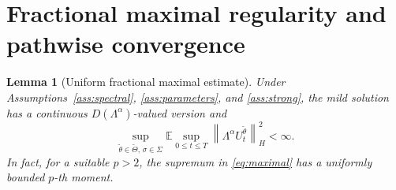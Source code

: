 \documentclass[11pt]{article}
\newtheorem{lemma}[assumption]{Lemma}
\theoremstyle{remark}
\newcommand{\E}{\mathbb E}
\newcommand{\1}{\mathbf 1}
\newcommand{\hnorm}[1]{\left\lVert #1\right\rVert_H}
\newcommand{\ThetaI}{\widetilde\Theta}
\newcommand{\Lambdaop}{\Lambda}
\begin{document}
\section{Fractional maximal regularity and pathwise convergence}

\begin{lemma}[Uniform fractional maximal estimate]\label{lem:maximal}
Under Assumptions~\ref{ass:spectral}, \ref{ass:parameters}, and \ref{ass:strong}, the mild solution has a continuous \(D(\Lambdaop^\alpha)\)-valued version and
\begin{equation}\label{eq:maximal}
 \sup_{\widetilde\theta\in\ThetaI,\,\sigma\in\Sigma}
 \E\sup_{0\le t\le T}
 \hnorm{\Lambdaop^\alpha U_t^{\widetilde\theta}}^2
 <\infty.
\end{equation}
In fact, for a suitable \(p>2\), the supremum in \eqref{eq:maximal} has a uniformly bounded \(p\)-th moment.
\end{lemma}
\end{document}
